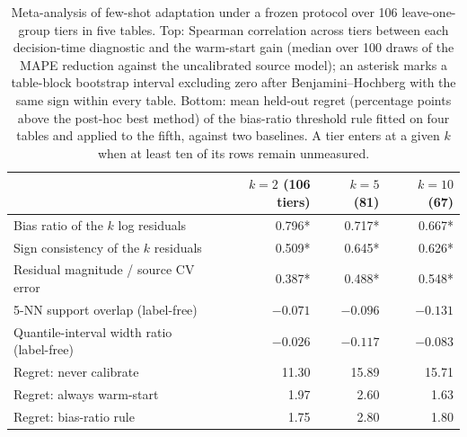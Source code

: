 \documentclass[11pt,a4paper]{article}
\begin{document}
\begin{table}[t]
\centering\small
\caption{Meta-analysis of few-shot adaptation under a frozen protocol over 106
leave-one-group tiers in five tables. Top: Spearman correlation across tiers
between each decision-time diagnostic and the warm-start gain (median over
100 draws of the MAPE reduction against the uncalibrated source model); an
asterisk marks a table-block bootstrap interval excluding zero after
Benjamini--Hochberg with the same sign within every table. Bottom: mean
held-out regret (percentage points above the post-hoc best method) of the
bias-ratio threshold rule fitted on four tables and applied to the fifth,
against two baselines. A tier enters at a given $k$ when at least ten of its
rows remain unmeasured.}
\label{tab:hj}
\begin{tabular}{lrrr}
\toprule
 & $k=2$ (106 tiers) & $k=5$ (81) & $k=10$ (67) \\
\midrule
Bias ratio of the $k$ log residuals & 0.796* & 0.717* & 0.667* \\
Sign consistency of the $k$ residuals & 0.509* & 0.645* & 0.626* \\
Residual magnitude / source CV error & 0.387* & 0.488* & 0.548* \\
5-NN support overlap (label-free) & $-0.071$ & $-0.096$ & $-0.131$ \\
Quantile-interval width ratio (label-free) & $-0.026$ & $-0.117$ & $-0.083$ \\
\midrule
Regret: never calibrate & 11.30 & 15.89 & 15.71 \\
Regret: always warm-start & 1.97 & 2.60 & 1.63 \\
Regret: bias-ratio rule & 1.75 & 2.80 & 1.80 \\
\bottomrule
\end{tabular}
\end{table}
\end{document}
